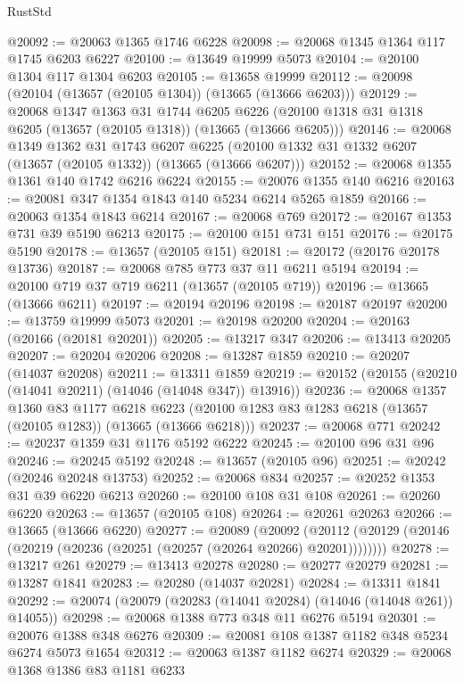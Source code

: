 \begin{lexlean}{RustStd}
\begin{coremodule}
@20092 := @20063 @1365 @1746 @6228
@20098 := @20068 @1345 @1364 @117 @1745 @6203 @6227
@20100 := @13649 @19999 @5073
@20104 := @20100 @1304 @117 @1304 @6203
@20105 := @13658 @19999
@20112 := @20098 (@20104 (@13657 (@20105 @1304)) (@13665 (@13666 @6203)))
@20129 := @20068
    @1347
    @1363
    @31
    @1744
    @6205
    @6226
    (@20100 @1318 @31 @1318 @6205 (@13657 (@20105 @1318)) (@13665 (@13666 @6205)))
@20146 := @20068
    @1349
    @1362
    @31
    @1743
    @6207
    @6225
    (@20100 @1332 @31 @1332 @6207 (@13657 (@20105 @1332)) (@13665 (@13666 @6207)))
@20152 := @20068 @1355 @1361 @140 @1742 @6216 @6224
@20155 := @20076 @1355 @140 @6216
@20163 := @20081 @347 @1354 @1843 @140 @5234 @6214 @5265 @1859
@20166 := @20063 @1354 @1843 @6214
@20167 := @20068 @769
@20172 := @20167 @1353 @731 @39 @5190 @6213
@20175 := @20100 @151 @731 @151
@20176 := @20175 @5190
@20178 := @13657 (@20105 @151)
@20181 := @20172 (@20176 @20178 @13736)
@20187 := @20068 @785 @773 @37 @11 @6211 @5194
@20194 := @20100 @719 @37 @719 @6211 (@13657 (@20105 @719))
@20196 := @13665 (@13666 @6211)
@20197 := @20194 @20196
@20198 := @20187 @20197
@20200 := @13759 @19999 @5073
@20201 := @20198 @20200
@20204 := @20163 (@20166 (@20181 @20201))
@20205 := @13217 @347
@20206 := @13413 @20205
@20207 := @20204 @20206
@20208 := @13287 @1859
@20210 := @20207 (@14037 @20208)
@20211 := @13311 @1859
@20219 := @20152 (@20155 (@20210 (@14041 @20211) (@14046 (@14048 @347)) @13916))
@20236 := @20068
    @1357
    @1360
    @83
    @1177
    @6218
    @6223
    (@20100 @1283 @83 @1283 @6218 (@13657 (@20105 @1283)) (@13665 (@13666 @6218)))
@20237 := @20068 @771
@20242 := @20237 @1359 @31 @1176 @5192 @6222
@20245 := @20100 @96 @31 @96
@20246 := @20245 @5192
@20248 := @13657 (@20105 @96)
@20251 := @20242 (@20246 @20248 @13753)
@20252 := @20068 @834
@20257 := @20252 @1353 @31 @39 @6220 @6213
@20260 := @20100 @108 @31 @108
@20261 := @20260 @6220
@20263 := @13657 (@20105 @108)
@20264 := @20261 @20263
@20266 := @13665 (@13666 @6220)
@20277 := @20089
    (@20092 (@20112 (@20129 (@20146 (@20219 (@20236 (@20251 (@20257 (@20264 @20266) @20201))))))))
@20278 := @13217 @261
@20279 := @13413 @20278
@20280 := @20277 @20279
@20281 := @13287 @1841
@20283 := @20280 (@14037 @20281)
@20284 := @13311 @1841
@20292 := @20074 (@20079 (@20283 (@14041 @20284) (@14046 (@14048 @261)) @14055))
@20298 := @20068 @1388 @773 @348 @11 @6276 @5194
@20301 := @20076 @1388 @348 @6276
@20309 := @20081 @108 @1387 @1182 @348 @5234 @6274 @5073 @1654
@20312 := @20063 @1387 @1182 @6274
@20329 := @20068
    @1368
    @1386
    @83
    @1181
    @6233

\end{coremodule}
\end{lexlean}
